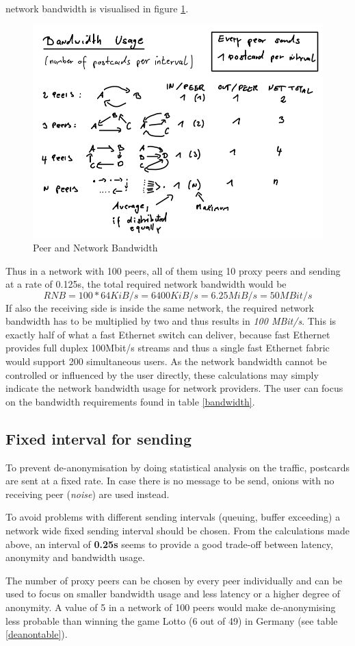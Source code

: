 network bandwidth is visualised in figure \ref{bandwidthfigure}.
\begin{figure}
    \centering
    \caption{Peer and Network Bandwidth}
    \label{bandwidthfigure}
    \includegraphics[scale=0.8]{bandwidth.png}
\end{figure}
Thus in a network with 100 peers, all of them using 10 proxy peers
and sending at a rate of 0.125s, the total required network bandwidth would be
$$RNB = 100 * 64 KiB/s = 6400 KiB/s = 6.25MiB/s = 50 MBit/s$$
If also the receiving side is inside the same network, the required network
bandwidth has to be multiplied by two and thus results in 
\textit{100 MBit/s}. This is exactly half of what a fast Ethernet switch
can deliver, because fast Ethernet provides full duplex 100Mbit/s streams
and thus a single fast Ethernet fabric would support 200 simultaneous users.
As the network bandwidth cannot be controlled or influenced by the user
directly, these calculations may simply indicate the network bandwidth
usage for network providers. The user can focus on the bandwidth requirements
found in table \ref{bandwidth}.
\subsection{Fixed interval for sending}
To prevent de-anonymisation by doing statistical analysis on the traffic,
postcards are sent at a fixed rate.
In case there is no message to be send, onions with no receiving
peer (\textit{noise}) are used instead.

To avoid problems with different sending intervals
(queuing, buffer exceeding) a network wide fixed sending interval
should be chosen. From the calculations made above, an interval
of \textbf{0.25s} seems to provide a good trade-off between
latency, anonymity and bandwidth usage.

The number of proxy peers can be chosen by every peer individually
and can be used to focus on smaller bandwidth usage and less latency
or a higher degree of anonymity. A value of 5 in a network of 100 peers
would make de-anonymising less probable than winning the game
Lotto (6 out of 49) in Germany (see table \ref{deanontable}).
